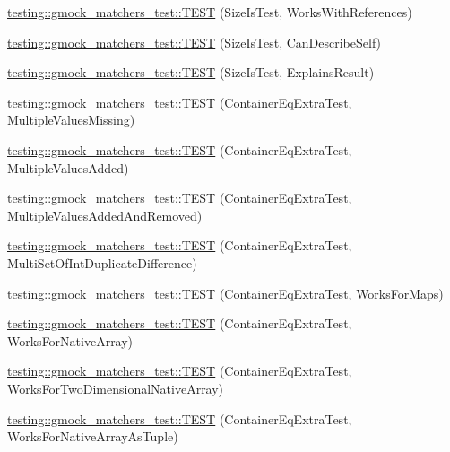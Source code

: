 \begin{DoxyCompactItemize}
\item 
\hyperlink{namespacetesting_1_1gmock__matchers__test_a53bcd375786f69d889a8e8891ff8e0b0}{testing\+::gmock\+\_\+matchers\+\_\+test\+::\+T\+E\+ST} (Size\+Is\+Test, Works\+With\+References)
\item 
\hyperlink{namespacetesting_1_1gmock__matchers__test_adc9720306de1626aa7e523637ca64dfa}{testing\+::gmock\+\_\+matchers\+\_\+test\+::\+T\+E\+ST} (Size\+Is\+Test, Can\+Describe\+Self)
\item 
\hyperlink{namespacetesting_1_1gmock__matchers__test_a6c218845fd345302c490ef53f0d36995}{testing\+::gmock\+\_\+matchers\+\_\+test\+::\+T\+E\+ST} (Size\+Is\+Test, Explains\+Result)
\item 
\hyperlink{namespacetesting_1_1gmock__matchers__test_ab84ac6cfde20f21ed69d5d7aa882ea1b}{testing\+::gmock\+\_\+matchers\+\_\+test\+::\+T\+E\+ST} (Container\+Eq\+Extra\+Test, Multiple\+Values\+Missing)
\item 
\hyperlink{namespacetesting_1_1gmock__matchers__test_acc28beb0f3d3fbd8923bad7eb08ce6a6}{testing\+::gmock\+\_\+matchers\+\_\+test\+::\+T\+E\+ST} (Container\+Eq\+Extra\+Test, Multiple\+Values\+Added)
\item 
\hyperlink{namespacetesting_1_1gmock__matchers__test_acb0d845f828c2d5a551e4db0611f2853}{testing\+::gmock\+\_\+matchers\+\_\+test\+::\+T\+E\+ST} (Container\+Eq\+Extra\+Test, Multiple\+Values\+Added\+And\+Removed)
\item 
\hyperlink{namespacetesting_1_1gmock__matchers__test_a6bce9564bb713ffb690b776e35d2e6cf}{testing\+::gmock\+\_\+matchers\+\_\+test\+::\+T\+E\+ST} (Container\+Eq\+Extra\+Test, Multi\+Set\+Of\+Int\+Duplicate\+Difference)
\item 
\hyperlink{namespacetesting_1_1gmock__matchers__test_ab7bcbeeeb23094cff6f2882304c05134}{testing\+::gmock\+\_\+matchers\+\_\+test\+::\+T\+E\+ST} (Container\+Eq\+Extra\+Test, Works\+For\+Maps)
\item 
\hyperlink{namespacetesting_1_1gmock__matchers__test_ae5e5420340c8cf91d24af11feca669b0}{testing\+::gmock\+\_\+matchers\+\_\+test\+::\+T\+E\+ST} (Container\+Eq\+Extra\+Test, Works\+For\+Native\+Array)
\item 
\hyperlink{namespacetesting_1_1gmock__matchers__test_a3cf0d2f2c08e34ca0b7e11ff27b4a7ca}{testing\+::gmock\+\_\+matchers\+\_\+test\+::\+T\+E\+ST} (Container\+Eq\+Extra\+Test, Works\+For\+Two\+Dimensional\+Native\+Array)
\item 
\hyperlink{namespacetesting_1_1gmock__matchers__test_a94e4a2a02cde84ac51e37cda1813bc77}{testing\+::gmock\+\_\+matchers\+\_\+test\+::\+T\+E\+ST} (Container\+Eq\+Extra\+Test, Works\+For\+Native\+Array\+As\+Tuple)

\end{DoxyCompactItemize}
